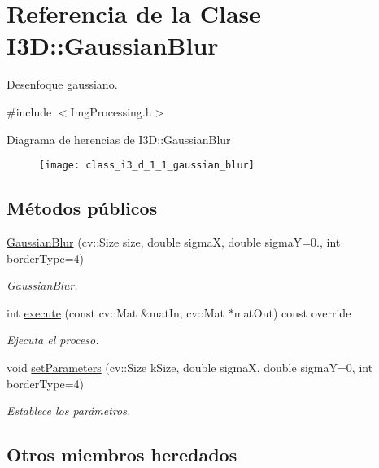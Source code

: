 \hypertarget{class_i3_d_1_1_gaussian_blur}{}\section{Referencia de la Clase I3D\+:\+:Gaussian\+Blur}
\label{class_i3_d_1_1_gaussian_blur}


Desenfoque gaussiano.  




{\ttfamily \#include $<$Img\+Processing.\+h$>$}

Diagrama de herencias de I3D\+:\+:Gaussian\+Blur\begin{figure}[H]
\begin{center}
\leavevmode
\texttt{[image: class\_i3\_d\_1\_1\_gaussian\_blur]}
\end{center}
\end{figure}
\subsection*{Métodos públicos}
\begin{DoxyCompactItemize}
\item 
\hyperlink{class_i3_d_1_1_gaussian_blur_ae83c05d57cb336bff56230338c33da38}{Gaussian\+Blur} (cv\+::\+Size size, double sigmaX, double sigmaY=0., int border\+Type=4)
\begin{DoxyCompactList}\small\item\em \hyperlink{class_i3_d_1_1_gaussian_blur}{Gaussian\+Blur}. \end{DoxyCompactList}\item 
int \hyperlink{class_i3_d_1_1_gaussian_blur_a19812cea51167dd35e8a85d3178061d5}{execute} (const cv\+::\+Mat \&mat\+In, cv\+::\+Mat $\ast$mat\+Out) const  override
\begin{DoxyCompactList}\small\item\em Ejecuta el proceso. \end{DoxyCompactList}\item 
void \hyperlink{class_i3_d_1_1_gaussian_blur_a8d22c6f666e7939aaeaecf3a752f464a}{set\+Parameters} (cv\+::\+Size k\+Size, double sigmaX, double sigmaY=0, int border\+Type=4)
\begin{DoxyCompactList}\small\item\em Establece los parámetros. \end{DoxyCompactList}\end{DoxyCompactItemize}
\subsection*{Otros miembros heredados}


